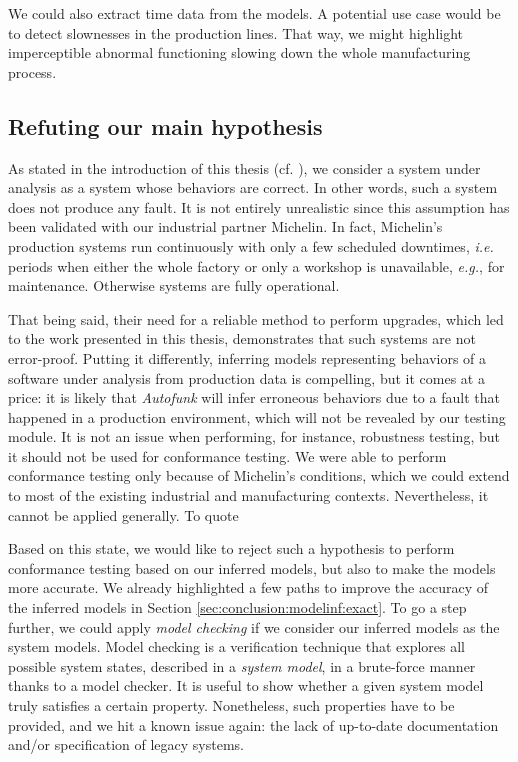 We could also extract time data from the models. A potential use
case would be to detect slownesses in the production lines. That
way, we might highlight imperceptible abnormal functioning
slowing down the whole manufacturing process.


\subsection{Refuting our main hypothesis}
\label{sec:conclusion:testing:valid}

As stated in the introduction of this thesis (cf.
), we consider a system
under analysis as a system whose behaviors are correct. In other
words, such a system does not produce any fault. It is not
entirely unrealistic since this assumption has been validated
with our industrial partner Michelin. In fact, Michelin's
production systems run continuously with only a few scheduled
downtimes, \emph{i.e.} periods when either the whole factory or only a
workshop is unavailable, \emph{e.g.}, for maintenance. Otherwise systems
are fully operational.

That being said, their need for a reliable method to perform
upgrades, which led to the work presented in this thesis,
demonstrates that such systems are not error-proof. Putting it
differently, inferring models representing behaviors of a
software under analysis from production data is compelling, but
it comes at a price: it is likely that \textit{Autofunk} will
infer erroneous behaviors due to a fault that happened in a
production environment, which will not be revealed by our testing
module. It is not an issue when performing, for instance,
robustness testing, but it should not be used for conformance
testing. We were able to perform conformance testing only because
of Michelin's conditions, which we could extend to most of the
existing industrial and manufacturing contexts. Nevertheless, it
cannot be applied generally. To quote

Based on this state, we would like to reject such a hypothesis to
perform conformance testing based on our inferred models, but
also to make the models more accurate. We already highlighted a
few paths to improve the accuracy of the inferred models in
Section \ref{sec:conclusion:modelinf:exact}. To go a step
further, we could apply \emph{model checking}
\cite{baier2008principles} if we consider our inferred models as
the system models. Model checking is a verification technique
that explores all possible system states, described in a
\textit{system model}, in a brute-force manner thanks to a model
checker. It is useful to show whether a given system model truly
satisfies a certain property.  Nonetheless, such properties have
to be provided, and we hit a known issue again: the lack of
up-to-date documentation and/or specification of legacy systems.
